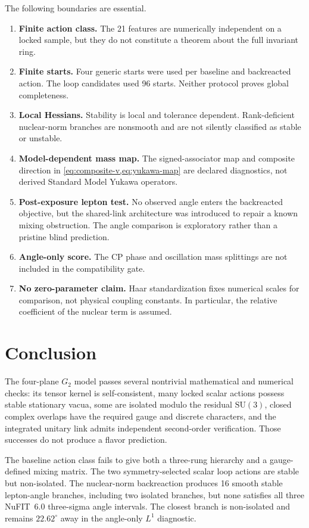 \documentclass[11pt]{article}
\newcommand{\SU}{\mathrm{SU}}
\begin{document}
The following boundaries are essential.
\begin{enumerate}[leftmargin=2.1em]
  \item \textbf{Finite action class.}  The 21 features are numerically independent on a locked sample, but they do not constitute a theorem about the full invariant ring.
  \item \textbf{Finite starts.}  Four generic starts were used per baseline and backreacted action.  The loop candidates used 96 starts.  Neither protocol proves global completeness.
  \item \textbf{Local Hessians.}  Stability is local and tolerance dependent.  Rank-deficient nuclear-norm branches are nonsmooth and are not silently classified as stable or unstable.
  \item \textbf{Model-dependent mass map.}  The signed-associator map and composite direction in \cref{eq:composite-v,eq:yukawa-map} are declared diagnostics, not derived Standard Model Yukawa operators.
  \item \textbf{Post-exposure lepton test.}  No observed angle enters the backreacted objective, but the shared-link architecture was introduced to repair a known mixing obstruction.  The angle comparison is exploratory rather than a pristine blind prediction.
  \item \textbf{Angle-only score.}  The CP phase and oscillation mass splittings are not included in the compatibility gate.
  \item \textbf{No zero-parameter claim.}  Haar standardization fixes numerical scales for comparison, not physical coupling constants.  In particular, the relative coefficient of the nuclear term is assumed.
\end{enumerate}

\section{Conclusion}

The four-plane $G_2$ model passes several nontrivial mathematical and numerical checks: its tensor kernel is self-consistent, many locked scalar actions possess stable stationary vacua, some are isolated modulo the residual $\SU(3)$, closed complex overlaps have the required gauge and discrete characters, and the integrated unitary link admits independent second-order verification.  Those successes do not produce a flavor prediction.

The baseline action class fails to give both a three-rung hierarchy and a gauge-defined mixing matrix.  The two symmetry-selected scalar loop actions are stable but non-isolated.  The nuclear-norm backreaction produces 16 smooth stable lepton-angle branches, including two isolated branches, but none satisfies all three NuFIT~6.0 three-sigma angle intervals.  The closest branch is non-isolated and remains $22.62^\circ$ away in the angle-only $L^1$ diagnostic.
\end{document}
